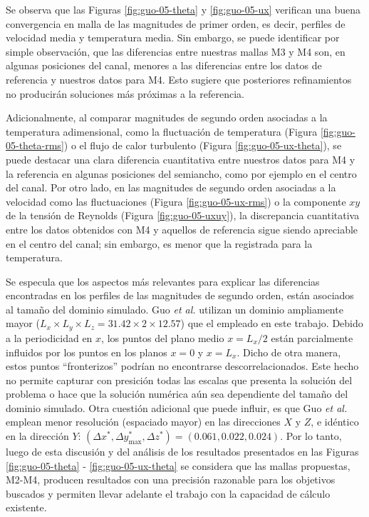 Se observa que las Figuras \ref{fig:guo-05-theta} y \ref{fig:guo-05-ux} verifican una buena convergencia en malla de las  magnitudes de primer orden, es decir, perfiles de velocidad media y temperatura media. Sin embargo, se puede identificar por simple observación, que las diferencias entre nuestras mallas M3 y M4 son, en algunas posiciones del canal, menores a las diferencias entre los datos de referencia y nuestros datos para M4. Esto sugiere que posteriores refinamientos no producirán soluciones más próximas a la referencia. 

Adicionalmente, al comparar magnitudes de segundo orden asociadas a la temperatura adimensional, como la fluctuación de temperatura (Figura \ref{fig:guo-05-theta-rms}) o el flujo de calor turbulento (Figura \ref{fig:guo-05-ux-theta}), se puede destacar una clara diferencia cuantitativa entre nuestros datos para M4 y la referencia en algunas posiciones del semiancho, como por ejemplo en el centro del canal. Por otro lado, en las magnitudes de segundo orden asociadas a la velocidad como las fluctuaciones (Figura \ref{fig:guo-05-ux-rms}) o la componente $xy$ de la tensión de Reynolds (Figura \ref{fig:guo-05-uxuy}), la discrepancia cuantitativa entre los datos obtenidos con M4 y aquellos de referencia sigue siendo apreciable en el centro del canal; sin embargo, es menor que la registrada para la temperatura.

Se especula que los aspectos más relevantes para explicar las diferencias encontradas en los perfiles de las magnitudes de segundo orden, están asociados al tamaño del dominio simulado. Guo \textit{et al.} utilizan un dominio ampliamente mayor ($L_x \times L_y \times L_z = 31\text{.}42 \times 2 \times 12\text{.}57$) que el empleado en este trabajo. Debido a la periodicidad en $x$, los puntos del plano medio $x = L_x/2$ están parcialmente influidos por los puntos en los planos $x=0$ y $x=L_x$. Dicho de otra manera, estos puntos ``fronterizos'' podrían no encontrarse descorrelacionados. Este hecho no permite capturar con presición todas las escalas que presenta la solución del problema o hace que la solución numérica aún sea dependiente del tamaño del dominio simulado. Otra cuestión adicional que puede influir, es que Guo \textit{et al.} emplean menor resolución (espaciado mayor) en las direcciones $X$ y $Z$, e idéntico en la dirección $Y$: $(\Delta x^*,\Delta y^*_{\text{max}},\Delta z^*) = (0\text{.}061, 0\text{.}022, 0\text{.}024)$. Por lo tanto, luego de esta discusión y del análisis de los resultados presentados en las Figuras \ref{fig:guo-05-theta} - \ref{fig:guo-05-ux-theta} se considera que las mallas propuestas, M2-M4, producen resultados con una precisión razonable para los objetivos buscados y permiten llevar adelante el trabajo con la capacidad de cálculo existente. 

